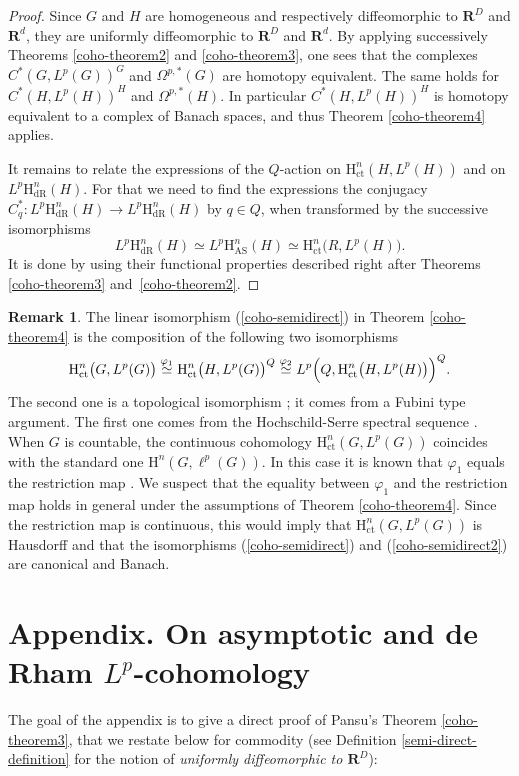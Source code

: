 \documentclass[JEP,XML,SOM,Unicode,published]{cedram}
\newcommand{\AS}{\mathrm{AS}}
\newcommand{\ct}{\mathrm{ct}}
\newcommand{\dR}{\mathrm{dR}}
\newcommand{\rH}{\mathrm{H}}
\newcommand{\RR}{\mathbf{R}}
\theoremstyle{plain}
\theoremstyle{remark}
\theoremstyle{definition}
\newtheorem{remark}[equation]{Remark}
\begin{document}
\begin{proof}
Since $G$ and $H$ are homogeneous and respectively diffeomorphic to $\RR^D$ and $\RR^d$, they are uniformly diffeomorphic to $\RR^D$ and $\RR^d$.
By applying successively Theorems \ref{coho-theorem2} and \ref{coho-theorem3}, one sees that the complexes $C^*(G, L^p(G))^G$ and $\Omega^{p,*}(G)$ are homotopy equivalent.
The same holds for $C^*(H, L^p(H))^H$ and $\Omega^{p,*}(H)$.
In particular $C^*(H, L^p(H))^H$ is homotopy equivalent to a complex of Banach spaces, and thus Theorem \ref{coho-theorem4} applies.

It remains to relate the expressions of the $Q$-action on $\rH_\ct^n(H, L^p(H))$ and on $L^p\rH_\dR^n(H)$.
For that we need to find the expressions the conjugacy $C_q^*: L^p\rH_\dR^n(H) \to L^p\rH_\dR^n(H)$ by $q \in Q$, when transformed by the successive isomorphisms
\[ L^p\rH_\dR^n(H) \simeq L^p\rH_\AS^n(H) \simeq \rH_\ct^n \bigl(R, L^p(H)\bigr).\]
It is done by using their functional properties described right after Theorems \ref{coho-theorem3} and~\ref{coho-theorem2}.
\end{proof}

\begin{remark}
The linear isomorphism (\ref{coho-semidirect}) in Theorem \ref{coho-theorem4} is the composition of the following two isomorphisms
\[\rH_\ct^n \bigl(G, L^p(G)\bigr)
\stackrel{\varphi_1}{\simeq}
\rH_\ct^n \bigl(H, L^p(G)\bigr)^Q
\stackrel{\varphi_2}{\simeq}
L^p\Bigl(Q, \rH_\ct^n \bigl(H, L^p(H)\bigr)\Bigr)^Q.\]
The second one is a topological isomorphism \cite[Prop.\,5.2]{BR}; it comes from a Fubini type argument.
The first one comes from the Hochschild-Serre spectral sequence \cite[Th.\,IX.4.3]{BW}.
When $G$ is countable, the continuous cohomology $\rH_\ct^n(G, L^p(G))$ coincides with the standard
one $\rH^n(G, \ell^p(G))$.
In this case it is known that $\varphi_1$ equals the restriction map \cite[Th.\,III.2]{HS}.
We suspect that the equality between $\varphi_1$ and the restriction map holds in general under the assumptions of Theorem \ref{coho-theorem4}.
Since the restriction map is continuous, this would imply that $\rH_\ct^n(G, L^p(G))$ is Hausdorff and that the isomorphisms (\ref{coho-semidirect}) and (\ref{coho-semidirect2}) are canonical and Banach.
\end{remark}

\appendix
{}
\section*{Appendix. On asymptotic and de Rham \texorpdfstring{$L^p$}{Lp}-cohomology}
\label{app - asymptotic and de Rham}
The goal of the appendix is to give a direct proof of Pansu's Theorem \ref{coho-theorem3}, that we restate below for commodity (see Definition \ref{semi-direct-definition} for the notion of \emph{uniformly diffeomorphic to $\RR^D$}):
\end{document}
